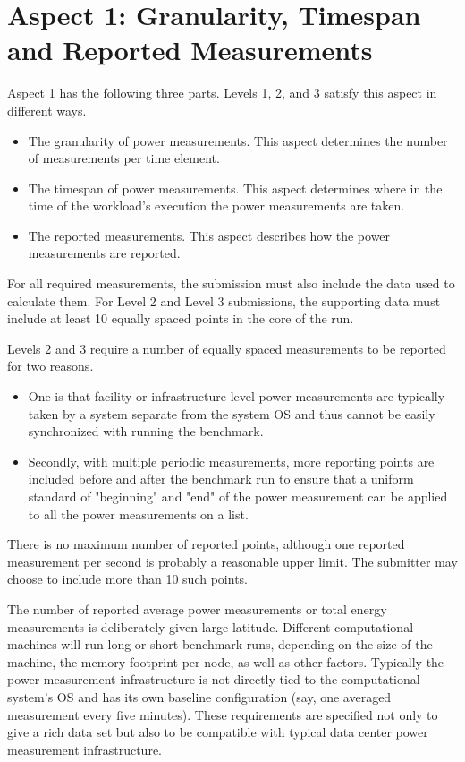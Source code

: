 \section{Aspect 1: Granularity, Timespan and Reported Measurements}
\label{sec:A1GTRM}
\noindent
Aspect 1 has the following three parts. Levels 1, 2, and 3 satisfy this aspect in different ways.

\begin{itemize}
\item
The granularity of power measurements. This aspect determines the number of measurements per time element.
\item
The timespan of power measurements. This aspect determines where in the time of the workload's execution the power measurements are taken.
\item
The reported measurements. This aspect describes how the power measurements are reported.
\end{itemize}

\noindent
For all required measurements, the submission must also include the data used to calculate them. For Level 2 and Level 3 submissions, the supporting data must include at least 10 equally spaced points in the core of the run. 
\wl

\noindent
Levels 2 and 3 require a number of equally spaced measurements to be reported for two reasons.  

\begin{itemize}
\item
One is that facility or infrastructure level power measurements are typically taken by a system separate from the system OS and thus cannot be easily synchronized with running the benchmark.  
\item
Secondly, with multiple periodic measurements, more reporting points are included before and after the benchmark run to ensure that a uniform standard of "beginning" and "end" of the power measurement can be applied to all the power measurements on a list.  
\end{itemize}

\noindent
There is no maximum number of reported points, although one reported measurement per second is probably a reasonable upper limit. The submitter may choose to include more than 10 such points.
\wl

\noindent
The number of reported average power measurements or total energy measurements is deliberately given large latitude.  Different computational machines will run long or short benchmark runs, depending on the size of the machine, the memory footprint per node, as well as other factors.  Typically the power measurement infrastructure is not directly tied to the computational system's OS and has its own baseline configuration (say, one averaged measurement every five minutes).  These requirements are specified not only to give a rich data set but also to be compatible with typical data center power measurement infrastructure.
\wl

